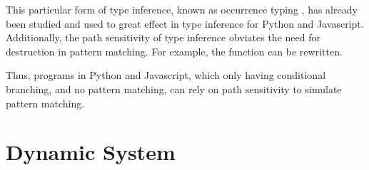 \documentclass[table,dvipsnames,acmsmall]{acmart}
\theoremstyle{definition}
\begin{document}
\noindent
This particular form of type inference, known as occurrence typing \cite{},
has already been studied and used to great effect in type inference for Python and Javascript.
Additionally, the path sensitivity of type inference obviates the need 
for destruction in pattern matching.  
For example, the  function can be rewritten.


\noindent
Thus, programs in Python and Javascript, which only having conditional branching,
and no pattern matching, can rely on path sensitivity to simulate pattern matching. 














\section{Dynamic System}
\label{sec:dynamic_system}

\end{document}
